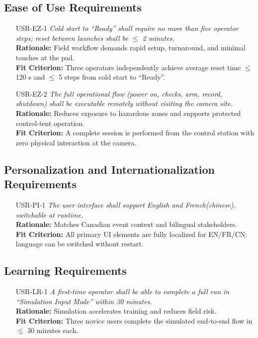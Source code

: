 \documentclass[12pt]{article}
\begin{document}
\subsection{Ease of Use Requirements}
\begin{itemize}[leftmargin=*]
  \item[USR-EZ-1] \emph{Cold start to “Ready” shall require no more than five operator steps; reset between launches shall be $\leq$ 2 minutes.}\\
  \textbf{Rationale:} Field workflow demands rapid setup, turnaround, and minimal touches at the pad.\\
  \textbf{Fit Criterion:} Three operators independently achieve average reset time $\leq$ 120 s and $\leq$ 5 steps from cold start to “Ready”.

  \item[USR-EZ-2] \emph{The full operational flow (power on, checks, arm, record, shutdown) shall be executable remotely without visiting the camera site.}\\
  \textbf{Rationale:} Reduces exposure to hazardous zones and supports protected control-tent operation.\\
  \textbf{Fit Criterion:} A complete session is performed from the control station with zero physical interaction at the camera.
\end{itemize}


\subsection{Personalization and Internationalization Requirements}
\begin{itemize}[leftmargin=*]
  \item[USR-PI-1] \emph{The user interface shall support English and French(chinese), switchable at runtime.}\\
  \textbf{Rationale:} Matches Canadian event context and bilingual stakeholders.\\
  \textbf{Fit Criterion:} All primary UI elements are fully localized for EN/FR/CN; language can be switched without restart.
\end{itemize}

\subsection{Learning Requirements}
\begin{itemize}[leftmargin=*]
  \item[USR-LR-1] \emph{A first-time operator shall be able to complete a full run in “Simulation Input Mode” within 30 minutes.}\\
  \textbf{Rationale:} Simulation accelerates training and reduces field risk.\\
  \textbf{Fit Criterion:} Three novice users complete the simulated end-to-end flow in $\leq$ 30 minutes each.
\end{itemize}
\end{document}
